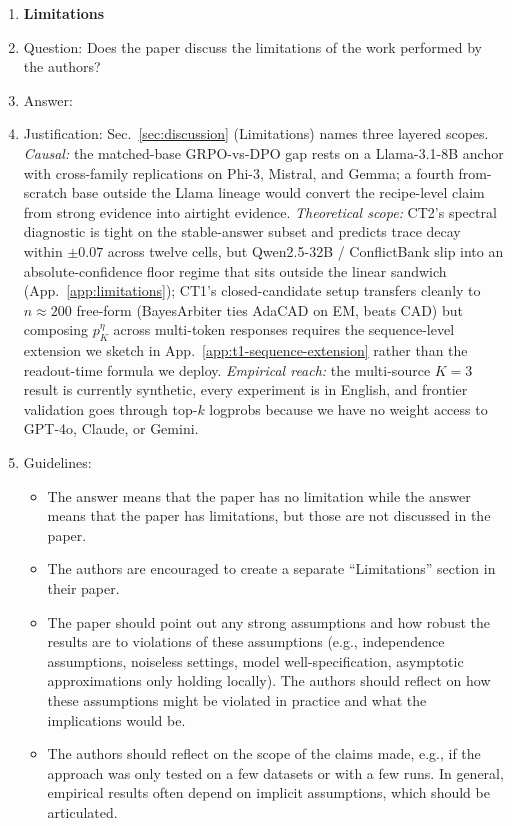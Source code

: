 \begin{enumerate}
\item \textbf{Limitations}
    \item[] Question: Does the paper discuss the limitations of the work performed by the authors?
    \item[] Answer: \answerYes{}
    \item[] Justification: Sec.~\ref{sec:discussion} (Limitations) names three layered scopes. \emph{Causal:} the matched-base GRPO-vs-DPO gap rests on a Llama-3.1-8B anchor with cross-family replications on Phi-3, Mistral, and Gemma; a fourth from-scratch base outside the Llama lineage would convert the recipe-level claim from strong evidence into airtight evidence. \emph{Theoretical scope:} CT2's spectral diagnostic is tight on the stable-answer subset and predicts trace decay within $\pm 0.07$ across twelve cells, but Qwen2.5-32B / ConflictBank slip into an absolute-confidence floor regime that sits outside the linear sandwich (App.~\ref{app:limitations}); CT1's closed-candidate setup transfers cleanly to $n\!\approx\!200$ free-form (BayesArbiter ties AdaCAD on EM, beats CAD) but composing $p_K^\eta$ across multi-token responses requires the sequence-level extension we sketch in App.~\ref{app:t1-sequence-extension} rather than the readout-time formula we deploy. \emph{Empirical reach:} the multi-source $K\!=\!3$ result is currently synthetic, every experiment is in English, and frontier validation goes through top-$k$ logprobs because we have no weight access to GPT-4o, Claude, or Gemini.
    \item[] Guidelines:
    \begin{itemize}
        \item The answer \answerNA{} means that the paper has no limitation while the answer \answerNo{} means that the paper has limitations, but those are not discussed in the paper.
        \item The authors are encouraged to create a separate ``Limitations'' section in their paper.
        \item The paper should point out any strong assumptions and how robust the results are to violations of these assumptions (e.g., independence assumptions, noiseless settings, model well-specification, asymptotic approximations only holding locally). The authors should reflect on how these assumptions might be violated in practice and what the implications would be.
        \item The authors should reflect on the scope of the claims made, e.g., if the approach was only tested on a few datasets or with a few runs. In general, empirical results often depend on implicit assumptions, which should be articulated.

\end{itemize}
\end{enumerate}
